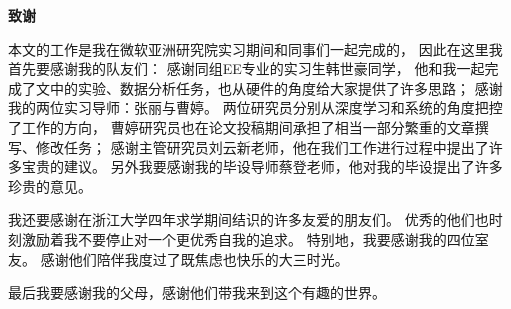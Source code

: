 \cleardoublepage{}
\begin{center}
    \bfseries {} 致谢
\end{center}
本文的工作是我在微软亚洲研究院实习期间和同事们一起完成的，
因此在这里我首先要感谢我的队友们：
感谢同组EE专业的实习生韩世豪同学，
他和我一起完成了文中的实验、数据分析任务，也从硬件的角度给大家提供了许多思路；
感谢我的两位实习导师：张丽与曹婷。
两位研究员分别从深度学习和系统的角度把控了工作的方向，
曹婷研究员也在论文投稿期间承担了相当一部分繁重的文章撰写、修改任务；
感谢主管研究员刘云新老师，他在我们工作进行过程中提出了许多宝贵的建议。
另外我要感谢我的毕设导师蔡登老师，他对我的毕设提出了许多珍贵的意见。

我还要感谢在浙江大学四年求学期间结识的许多友爱的朋友们。
优秀的他们也时刻激励着我不要停止对一个更优秀自我的追求。
特别地，我要感谢我的四位室友。
感谢他们陪伴我度过了既焦虑也快乐的大三时光。

最后我要感谢我的父母，感谢他们带我来到这个有趣的世界。